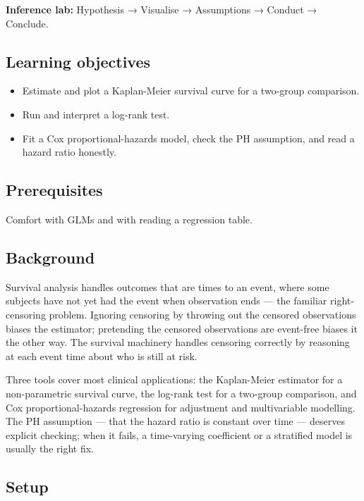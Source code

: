 \documentclass[
]{article}
\author{}
\date{\vspace{-2.5em}}
\providecommand{\tightlist}{%
  \setlength{\itemsep}{0pt}\setlength{\parskip}{0pt}}
\begin{document}
\textbf{Inference lab:} Hypothesis → Visualise → Assumptions → Conduct →
Conclude.

\subsection{Learning objectives}\label{learning-objectives}

\begin{itemize}
\tightlist
\item
  Estimate and plot a Kaplan-Meier survival curve for a two-group
  comparison.
\item
  Run and interpret a log-rank test.
\item
  Fit a Cox proportional-hazards model, check the PH assumption, and
  read a hazard ratio honestly.
\end{itemize}

\subsection{Prerequisites}\label{prerequisites}

Comfort with GLMs and with reading a regression table.

\subsection{Background}\label{background}

Survival analysis handles outcomes that are times to an event, where
some subjects have not yet had the event when observation ends --- the
familiar right-censoring problem. Ignoring censoring by throwing out the
censored observations biases the estimator; pretending the censored
observations are event-free biases it the other way. The survival
machinery handles censoring correctly by reasoning at each event time
about who is still at risk.

Three tools cover most clinical applications: the Kaplan-Meier estimator
for a non-parametric survival curve, the log-rank test for a two-group
comparison, and Cox proportional-hazards regression for adjustment and
multivariable modelling. The PH assumption --- that the hazard ratio is
constant over time --- deserves explicit checking; when it fails, a
time-varying coefficient or a stratified model is usually the right fix.

\subsection{Setup}\label{setup}
\end{document}
